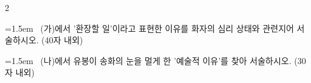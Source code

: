 \documentclass[10pt, a4paper]{article}
\begin{document}
\begin{multicols}{2}
\noindent\begin{minipage}{\columnwidth}
\vspace{2mm}
{\hangindent=1.5em  ~(가)에서 '환장할 일'이라고 표현한 이유를 화자의 심리 상태와 관련지어 서술하시오. (40자 내외)\par}

\vspace{3mm}
\noindent\hrulefill
\vspace{2.5mm}
\noindent\hrulefill
\vspace{2.5mm}
\noindent\hrulefill
\vspace{2.5mm}
\noindent\hrulefill
\vspace{2.5mm}
\noindent\hrulefill
\vspace{2.5mm}
\vspace{1mm}
\vspace{4mm}
\end{minipage}
\par

\noindent\begin{minipage}{\columnwidth}
\vspace{2mm}
{\hangindent=1.5em  ~(나)에서 유봉이 송화의 눈을 멀게 한 '예술적 이유'를 찾아 서술하시오. (30자 내외)\par}

\vspace{3mm}
\noindent\hrulefill
\vspace{2.5mm}
\noindent\hrulefill
\vspace{2.5mm}
\noindent\hrulefill
\vspace{2.5mm}
\noindent\hrulefill
\vspace{2.5mm}
\noindent\hrulefill
\vspace{2.5mm}
\vspace{1mm}
\vspace{4mm}
\end{minipage}
\par


\vspace{1mm}
\vspace{0.5mm}


\end{multicols}
\end{document}
